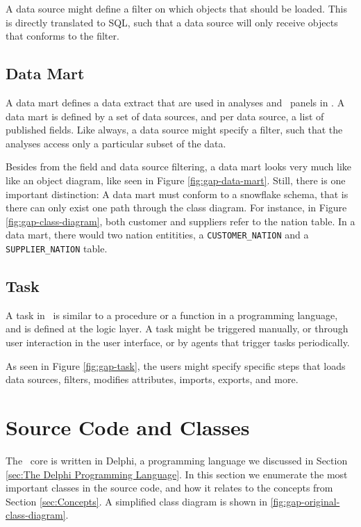 A data source might define a filter on which objects that should be loaded. This is directly translated to SQL, such that a data source will only receive objects that conforms to the filter.

\subsection{Data Mart}
\label{sub:Data Mart}
A data mart defines a data extract that are used in analyses and \bd~panels in \gap. A data mart is defined by a set of data sources, and per data source, a list of published fields. Like always, a data source might specify a filter, such that the analyses access only a particular subset of the data.

Besides from the field and data source filtering, a data mart looks very much like like an object diagram, like seen in Figure \ref{fig:gap-data-mart}. Still, there is one important distinction: A data mart must conform to a snowflake schema, that is there can only exist one path through the class diagram. For instance, in Figure \ref{fig:gap-class-diagram}, both customer and suppliers refer to the nation table. In a data mart, there would two nation entitities, a \texttt{CUSTOMER\_NATION} and a \texttt{SUPPLIER\_NATION} table.

\subsection{Task}
\label{sub:Task}
A task in \gap~is similar to a procedure or a function in a programming language, and is defined at the logic layer. A task might be triggered manually, or through user interaction in the user interface, or by agents that trigger tasks periodically.

As seen in Figure \ref{fig:gap-task}, the users might specify specific steps that loads data sources, filters, modifies attributes, imports, exports, and more.

\section{Source Code and Classes}
\label{sec:Source Code and Classes}
The \gap~core is written in Delphi, a programming language we discussed in Section \ref{sec:The Delphi Programming Language}. In this section we enumerate the most important classes in the source code, and how it relates to the concepts from Section \ref{sec:Concepts}. A simplified class diagram is shown in \ref{fig:gap-original-class-diagram}.


